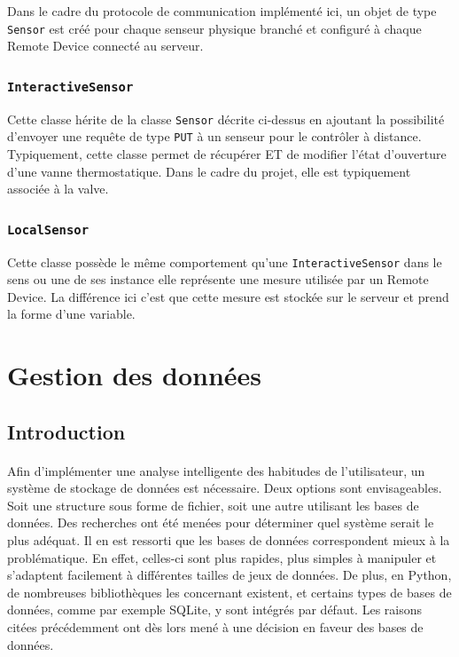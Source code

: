 \documentclass[11pt,a4paper,11pt]{report}
\begin{document}
Dans le cadre du protocole de communication implémenté ici, un objet de type \texttt{Sensor} est créé pour chaque senseur physique branché et configuré à chaque Remote Device connecté au serveur.

\subsubsection{\texttt{InteractiveSensor}}

Cette classe hérite de la classe \texttt{Sensor} décrite ci-dessus en ajoutant la possibilité d'envoyer une requête de type \texttt{PUT} à un senseur pour le contrôler à distance. Typiquement, cette classe permet de récupérer ET de modifier l'état d'ouverture d'une vanne thermostatique. Dans le cadre du projet, elle est typiquement associée à la valve.


\subsubsection{\texttt{LocalSensor}}

Cette classe possède le même comportement qu'une \texttt{InteractiveSensor} dans le sens ou une de ses instance elle représente une mesure utilisée par un Remote Device. La différence ici c'est que cette mesure est stockée sur le serveur et prend la forme d'une variable.\\


\newpage
\section{Gestion des données}

\subsection{Introduction}

\paragraph*{}
  Afin d'implémenter une analyse intelligente des habitudes de l'utilisateur, un système de stockage de données est nécessaire. Deux options sont envisageables. Soit une structure sous forme de fichier, soit une autre utilisant les bases de données. Des recherches ont été menées pour déterminer quel système serait le plus adéquat. Il en est ressorti que les bases de données correspondent mieux à la problématique. En effet, celles-ci sont plus rapides, plus simples à manipuler et s'adaptent facilement à différentes tailles de jeux de données. De plus, en Python, de nombreuses bibliothèques les concernant existent, et certains types de bases de données, comme par exemple SQLite, y sont intégrés par défaut. Les raisons citées précédemment ont dès lors mené à une décision en faveur des bases de données.
\end{document}
